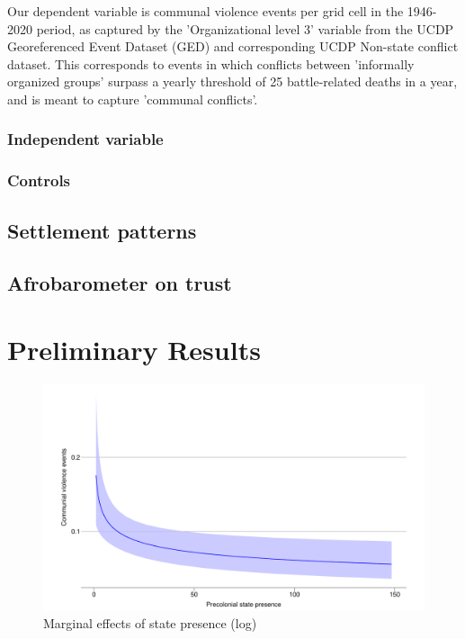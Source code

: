 \documentclass[12pt]{article}
\begin{document}
Our dependent variable is communal violence events per grid cell in the
1946-2020 period, as captured by the 'Organizational level 3' variable from the
UCDP Georeferenced Event Dataset (GED) and corresponding UCDP Non-state conflict
dataset. This corresponds to events in which conflicts between 'informally
organized groups' surpass a yearly threshold of 25 battle-related deaths in a
year, and is meant to capture 'communal conflicts'.

\subsubsection{Independent variable}
\subsubsection{Controls}

\subsection{Settlement patterns}

\subsection{Afrobarometer on trust}

\section{Preliminary Results}


\begin{figure}[htpb]
	\centering
	\includegraphics[width=1\linewidth]{../R/Output/CommunalViolenceMarginsLog.pdf}
	\caption{Marginal effects of state presence (log)}
	\label{margins}
\end{figure}







\end{document}
